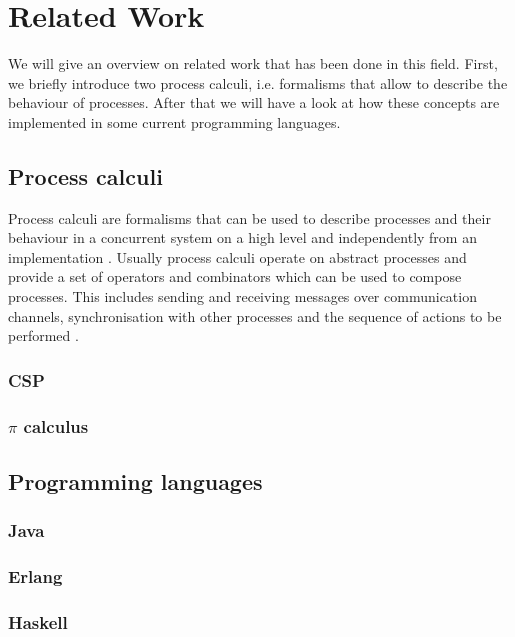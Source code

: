 \chapter{Related Work}
We will give an overview on related work that has been done in this field. First, we briefly introduce two process calculi, i.e. formalisms that allow to describe the behaviour of processes. After that we will have a look at how these concepts are implemented in some current programming languages.

\section{Process calculi}
Process calculi are formalisms that can be used to describe processes and their behaviour in a concurrent system on a high level and independently from an implementation \cite{}. Usually process calculi operate on abstract processes and provide a set of operators and combinators which can be used to compose processes. This includes sending and receiving messages over communication channels, synchronisation with other processes and the sequence of actions to be performed \cite{}.

\subsection{CSP}

\subsection{$\pi$ calculus}

\section{Programming languages}

\subsection{Java}

\subsection{Erlang}

\subsection{Haskell}